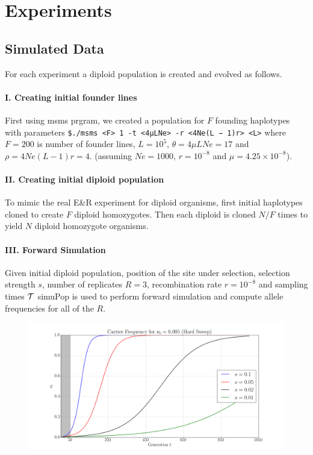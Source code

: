 \documentclass[11pt]{article}
\begin{document}
\section{Experiments}
\subsection{Simulated Data}
For each experiment a diploid population is created and evolved as follows. 
\paragraph{I. Creating initial founder lines}
First using msms prgram, we created a population for $F$ founding 
haplotypes with parameters \texttt{\$./msms <F> 1 -t <4μLNe> -r <4Ne(L − 
1)r> <L>} where $F=200$ is number of founder lines, 
$L=10^5$, $\theta=4\mu LNe=17$ and $\rho=4Ne(L-1)r=4$.  (assuming 
$Ne=1000$, $r=10^{-8}$ and $\mu=4.25\times 10^{-8}$).  
\paragraph{II. Creating initial diploid population} 
To mimic the real E\&R experiment for diploid organisms, first initial 
haplotypes cloned to create $F$ diploid homozygotes. Then each diploid is 
cloned $N/F$ times to yield $N$ diploid homozygote organisms.
\paragraph{III. Forward Simulation}
Given initial diploid population, position of the site under selection, selection 
strength $s$, number of replicates $R=3$, recombination rate $r=10^{-8}$ 
and sampling times ${\cal T}$ simuPop is used to perform forward simulation and 
compute allele frequencies for all of the $R$.

\begin{figure}[H]
	\centering
	\includegraphics[trim={ 2in 0 1.8in 0},clip,scale=0.4]{sigmoidHard.png}
\end{figure}
\end{document}
